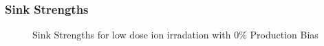 \documentclass[a4paper]{article}
\begin{document}
    \newpage
    \subsubsection{Sink Strengths}
      \begin{figure}[h!]  %
        \centering
        \qquad
        \caption{Sink Strengths for low dose ion irradation with 0\% Production Bias}
        \label{figure:sink_strengths_ion_0_1e-6}
      \end{figure}
\end{document}
